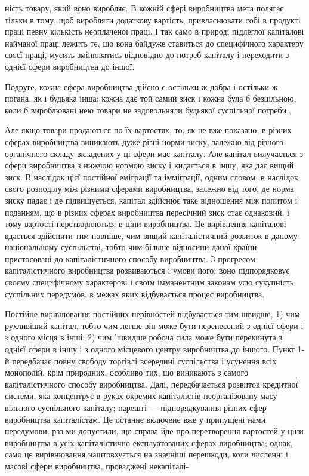 ність товару, який воно виробляє. В кожній сфері виробництва
мета полягає тільки в тому, щоб виробляти додаткову
вартість, привласнювати собі в продукті праці певну кількість
неоплаченої праці. І так само в природі підлеглої капіталові
найманої праці лежить те, що вона байдуже ставиться до
специфічного характеру своєї праці, мусить змінюватись відповідно
до потреб капіталу і переходити з однієї сфери виробництва
до іншої.

Подруге, кожна сфера виробництва дійсно є остільки ж добра
і остільки ж погана, як і будьяка інша; кожна дає той самий
зиск і кожна була б безцільною, коли б вироблювані нею товари
не задовольняли будьякої суспільної потреби.,

Але якщо товари продаються по їх вартостях, то, як це вже
показано, в різних сферах виробництва виникають дуже різні
норми зиску, залежно від різного органічного складу вкладених
у ці сфери мас капіталу. Але капітал вилучається з сфери виробництва
з нижчою нормою зиску і кидається в іншу, яка дає
вищий зиск. В наслідок цієї постійної еміграції та імміграції,
одним словом, в наслідок свого розподілу між різними сферами
виробництва, залежно від того, де норма зиску падає і де підвищується,
капітал здійснює таке відношення між попитом і поданням,
що в різних сферах виробництва пересічний зиск
стає однаковий, і тому вартості перетворюються в ціни виробництва.
Це вирівнення капіталові вдається здійснити тим повніше,
чим вищий капіталістичний розвиток в даному національному
суспільстві, тобто чим більше відносини даної країни пристосовані
до капіталістичного способу виробництва. З прогресом капіталістичного
виробництва розвиваються і умови його; воно підпорядковує
своєму специфічному характерові і своїм імманентним
законам усю сукупність суспільних передумов, в межах яких
відбувається процес виробництва.

Постійне вирівнювання постійних нерівностей відбувається
тим швидше, 1) чим рухливіший капітал, тобто чим легше він
може бути перенесений з однієї сфери і з одного місця в інші;
2) чим 'швидше робоча сила може бути перекинута з однієї
сфери в іншу і з одного місцевого центру виробництва до
іншого. Пункт 1-й передбачає повну свободу торгівлі всередині
суспільства і усунення всіх монополій, крім природних, особливо
тих, що виникають з самого капіталістичного способу виробництва.
Далі, передбачається розвиток кредитної системи, яка
концентрує в руках окремих капіталістів неорганізовану масу
вільного суспільного капіталу; нарешті — підпорядкування різних
сфер виробництва капіталістам. Це останнє включене вже
у припущені нами передумови, раз ми допустили, що справа
йде про перетворення вартостей у ціни виробництва в усіх капіталістично
експлуатованих сферах виробництва; однак, само
це вирівнювання наштовхується на значніші перешкоди, коли
численні і масові сфери виробництва, проваджені некапіталі-
